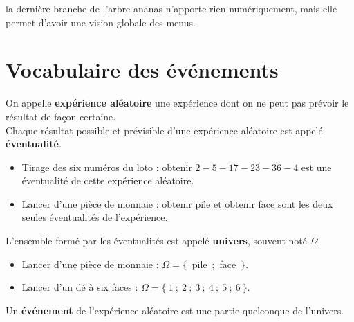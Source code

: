 \begin{remarque}
   la dernière branche de l'arbre \og ananas \fg{} n'apporte rien numériquement, mais elle permet d'avoir une vision globale des menus.
\end{remarque}

\section{Vocabulaire des événements} 

\begin{definition}
   On appelle \textbf{expérience aléatoire} une expérience dont on ne peut pas prévoir le résultat de façon certaine. \\
   Chaque résultat possible et prévisible d'une expérience aléatoire est appelé \textbf{éventualité}.
\end{definition}

\begin{exemple*1}
   \begin{itemize}
      \item Tirage des six numéros du loto : \og obtenir $2-5-17-23-36-4$ \fg{} est une éventualité de cette expérience aléatoire.
      \item Lancer d'une pièce de monnaie : \og obtenir pile \fg{} et \og obtenir face \fg{} sont les deux seules éventualités de l'expérience.
   \end{itemize}
\end{exemple*1}

\begin{definition}[Univers]
   L'ensemble formé par les éventualités est appelé \textbf{univers}, souvent noté $\Omega$.
\end{definition}

\begin{exemple*1}
   \begin{itemize}
      \item Lancer d'une pièce de monnaie : $\Omega =\{$~pile~;~face~$\}$.
      \item Lancer d'un dé à six faces : $\Omega =\{~1~;~2~;~3~;~4~;~5~;~6~\}$.
   \end{itemize}
\end{exemple*1}

\begin{definition}[Événement]
   Un \textbf{événement} de l'expérience aléatoire est une partie quelconque de l'univers.
\end{definition}

